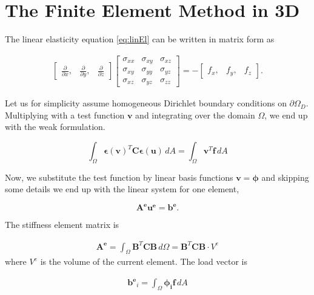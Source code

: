 \section{The Finite Element Method in 3D}

The linear elasticity equation \eqref{eq:linEl} can be written in matrix form as

\begin{align*}
\begin{bmatrix}
\frac{\partial}{\partial x}, & \frac{\partial}{\partial y}, & \frac{\partial}{\partial z}
\end{bmatrix}
\begin{bmatrix}
\sigma_{xx} & \sigma_{xy} & \sigma_{xz} \\
\sigma_{xy} & \sigma_{yy} & \sigma_{yz} \\
\sigma_{xz} & \sigma_{yz} & \sigma_{zz}
\end{bmatrix} = -
\begin{bmatrix}
f_x, & f_y, & f_z 
\end{bmatrix}.
\end{align*}

Let us for simplicity assume homogeneous Dirichlet boundary conditions on $\partial \Omega_D$. Multiplying with a test function $\bm{v}$ and integrating over the domain $\Omega$, we end up with the weak formulation. 

\begin{equation}
\int_\Omega \bm{\epsilon}(\bm{v})^T \bm{C} \bm{\epsilon}(\bm{u}) \, dA = \int_\Omega \bm{v}^T \bm{f} \, dA
\end{equation}

Now, we substitute the test function by linear basis functions $\bm{v} = \bm{\phi}$ and skipping some details we end up with the linear system for one element,

\begin{equation}
\label{eq:linear-system}
\bm{A^e} \bm{u^e} = \bm{b^e}.
\end{equation}

The stiffness element matrix is

\begin{align}
\bm{A^e} = \int_\Omega \bm{B}^T \bm{C} \bm{B} \, d\Omega = \bm{B}^T \bm{C} \bm{B} \cdot V^e
\end{align}
where $V^e$ is the volume of the current element. The load vector is

\begin{align}
\label{eq:load-vector}
\bm{b^e}_i = 
\int_{\Omega} \bm{\phi_i} \bm{f} \, dA 
\end{align}

